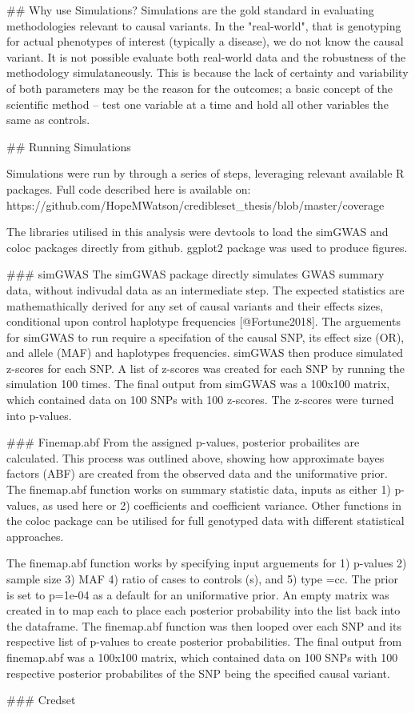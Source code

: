 ## Why use Simulations?
Simulations are the gold standard in evaluating methodologies relevant to causal variants. In the "real-world", that is genotyping for actual phenotypes of interest (typically a disease), we do not know the causal variant. It is not possible evaluate both real-world data and the robustness of the methodology simulataneously. This is because the lack of certainty and variability of both parameters may be the reason for the outcomes; a basic concept of the scientific method -- test one variable at a time and hold all other variables the same as controls. 

## Running Simulations

Simulations were run by through a series of steps, leveraging relevant available R packages. Full code described here is available on: https://github.com/HopeMWatson/credibleset_thesis/blob/master/coverage%

The libraries utilised in this analysis were devtools to load the simGWAS and coloc packages directly from github. ggplot2 package was used to produce figures. 

### simGWAS
The simGWAS package directly simulates GWAS summary data, without indivudal data as an intermediate step. The expected statistics are mathemathically derived for any set of causal variants and their effects sizes, conditional upon control haplotype frequencies [@Fortune2018]. The arguements for simGWAS to run require a specifation of the causal SNP, its effect size (OR), and allele (MAF) and haplotypes frequencies. simGWAS then produce simulated z-scores for each SNP. A list of z-scores was created for each SNP by running the simulation 100 times. The final output from simGWAS was a 100x100 matrix, which contained data on 100 SNPs with 100 z-scores. The z-scores were turned into p-values. 

### Finemap.abf 
From the assigned p-values, posterior probailites are calculated. This process was outlined above, showing how approximate bayes factors (ABF) are created from the observed data and the uniformative prior. The finemap.abf function works on summary statistic data, inputs as either 1) p-values, as used here or 2) coefficients and coefficient variance. Other functions in the coloc package can be utilised for full genotyped data with different statistical approaches. 

The finemap.abf function works by specifying input arguements for 1) p-values 2) sample size 3) MAF 4) ratio of cases to controls (s), and 5) type =cc. The prior is set to p=1e-04 as a default for an uniformative prior. An empty matrix was created in to map each to place each posterior probability into the list back into the dataframe. The finemap.abf function was then looped over each SNP and its respective list of p-values to create posterior probabilities. The final output from finemap.abf was a 100x100 matrix, which contained data on 100 SNPs with 100 respective posterior probabilites of the SNP being the specified causal variant. 

### Credset 